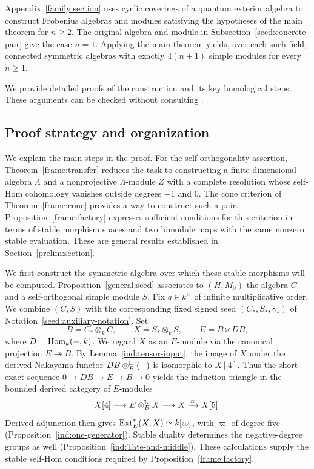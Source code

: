 \documentclass[11pt]{article}
\begin{document}
Appendix~\ref{family:section} uses cyclic coverings of a quantum exterior algebra to construct Frobenius algebras and modules satisfying the hypotheses of the main theorem for $n\ge2$. The original algebra and module in Subsection~\ref{seed:concrete-pair} give the case $n=1$. Applying the main theorem yields, over each such field, connected symmetric algebras with exactly $4(n+1)$ simple modules for every $n\ge1$.

We provide detailed proofs of the construction and its key homological steps.
These arguments can be checked without consulting \cite{O,F}.

\subsection{Proof strategy and organization}

We explain the main steps in the proof. For the self-orthogonality
assertion, Theorem~\ref{frame:transfer} reduces the task to constructing
a finite-dimensional algebra $\Lambda$ and a
nonprojective $\Lambda$-module $Z$ with a complete resolution whose
self-Hom cohomology vanishes outside degrees $-1$ and $0$. The cone
criterion of Theorem~\ref{frame:cone} provides a way to construct such a
pair. Proposition~\ref{frame:factory} expresses sufficient conditions
for this criterion in terms of stable morphism spaces and two bimodule
maps with the same nonzero stable evaluation. These are general results
established in Section~\ref{prelim:section}.

We first construct the symmetric algebra over which these stable
morphisms will be computed. Proposition~\ref{general:seed} associates
to $(H,M_0)$ the algebra $C$ and a self-orthogonal simple module $S$.
Fix $q\in k^\times$ of infinite multiplicative order. We combine
$(C,S)$ with the corresponding fixed signed seed $(C_*,S_*,\gamma_*)$
of Notation~\ref{seed:auxiliary-notation}.
Set
\[
 B=C_*\otimes_k C,\qquad X=S_*\otimes_k S,\qquad E=B\ltimes DB,
\]
where $D={\rm Hom}_k(-,k)$. We regard $X$ as an $E$-module via the
canonical projection $E\twoheadrightarrow B$.
By Lemma~\ref{ind:tensor-input}, the image of $X$ under the derived
Nakayama functor $DB\otimes^{\rm\mathbb L}_B(-)$ is isomorphic to $X[4]$.
Thus the short exact sequence
$0\to DB\to E\to B\to0$ yields the induction triangle
in the bounded derived category of $E$-modules
\[
 X[4]\longrightarrow E\otimes^{\rm\mathbb L}_BX
 \longrightarrow X\xrightarrow{\varpi}X[5].
\]
Derived adjunction then gives ${\rm Ext}_E^*(X,X)\simeq k[\varpi]$,
with $\varpi$ of degree five (Proposition~\ref{ind:one-generator}).
Stable duality determines the negative-degree groups as well
(Proposition~\ref{ind:Tate-and-middle}). These calculations supply the
stable self-Hom conditions required by Proposition~\ref{frame:factory}.
\end{document}
